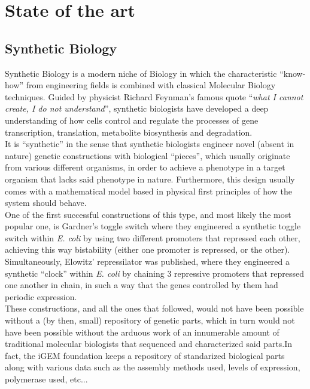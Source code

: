 \section{State of the art}


\subsection{Synthetic Biology}
Synthetic Biology is a modern niche of Biology in which the characteristic ``know-how'' from engineering fields is combined with classical Molecular Biology techniques. Guided by physicist Richard Feynman's famous quote ``\textit{what I cannot create, I do not understand}'', synthetic biologists have developed a deep understanding of how cells control and regulate the processes of gene transcription, translation, metabolite biosynthesis and degradation.\\

It is ``synthetic'' in the sense that synthetic biologists engineer novel (absent in nature) genetic constructions with biological ``pieces'', which usually originate from various different organisms, in order to achieve a phenotype in a target organism that lacks said phenotype in nature. Furthermore, this design usually comes with a mathematical model based in physical first principles of how the system should behave.\\

One of the first successful constructions of this type, and most likely the most popular one, is Gardner's toggle switch \cite{gardner_2000} where they engineered a synthetic toggle switch within \textit{E. coli} by using two different promoters that repressed each other, achieving this way bistability (either one promoter is repressed, or the other). Simultaneously, Elowitz' repressilator \cite{elowitz_2000} was published, where they engineered a synthetic ``clock'' within \textit{E. coli} by chaining 3 repressive promoters that repressed one another in chain, in such a way that the genes controlled by them had periodic expression.\\

These constructions, and all the ones that followed, would not have been possible without a (by then, small) repository of genetic parts, which in turn would not have been possible without the arduous work of an innumerable amount of traditional molecular biologists that sequenced and characterized said parts.In fact, the iGEM foundation keeps a repository of standarized biological parts \cite{parts_igem} along with various data such as the assembly methods used, levels of expression, polymerase used, etc...\\

